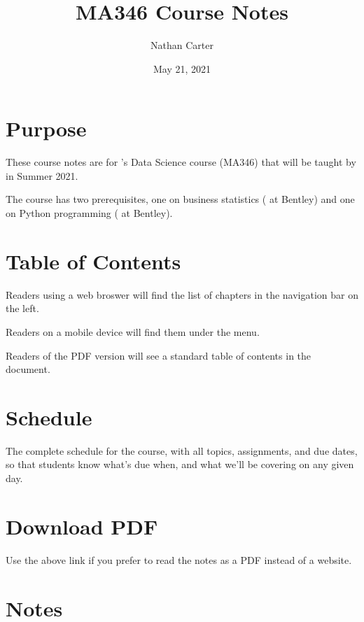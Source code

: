 \documentclass[letterpaper,10pt,english]{jupyterBook}
\title{MA346 Course Notes}
\date{May 21, 2021}
\author{Nathan Carter}
\begin{document}
\pagestyle{empty}
\sphinxmaketitle
\pagestyle{plain}
\sphinxtableofcontents
\pagestyle{normal}
\label{\detokenize{intro::doc}}



\part{ Purpose}
\label{\detokenize{intro:purpose}}
\sphinxAtStartPar
These course notes are for ’s Data Science course (MA346) that will be taught by  in Summer 2021.

\sphinxAtStartPar
The course has two prerequisites, one on business statistics ( at Bentley) and one on Python programming ( at Bentley).


\part{ Table of Contents}
\label{\detokenize{intro:table-of-contents}}
\sphinxAtStartPar
Readers using a web broswer will find the list of chapters in the navigation bar on the left.

\sphinxAtStartPar
Readers on a mobile device will find them under the  menu.

\sphinxAtStartPar
Readers of the PDF version will see a standard table of contents in the document.


\part{ Schedule}
\label{\detokenize{intro:schedule}}
\sphinxAtStartPar
The complete schedule for the course, with all topics, assignments, and due dates, so that students know what’s due when, and what we’ll be covering on any given day.


\part{ Download PDF}
\label{\detokenize{intro:a-href-static-ma346-course-notes-pdf-download-pdf-a}}
\sphinxAtStartPar
Use the above link if you prefer to read the notes as a PDF instead of a website.


\part{Notes}
\end{document}
